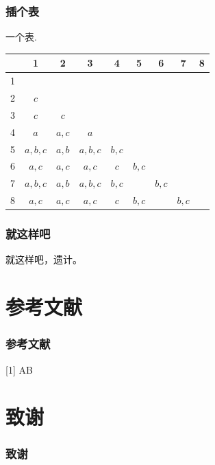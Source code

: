 \documentclass[notheorems,mathserif,table,Singapore]{beamer}
\begin{document}
\begin{frame}\frametitle{插个表}
一个表.
 \begin{table}
  \centering \addtolength{\tabcolsep}{1mm}
 \begin{tabular}{ccccccccc}
   \hline
        & 1 & 2 & 3 & 4 & 5 & 6 & 7 & 8 \\
   \hline
   1 &         &       &          &       &       &       &       &  \\
   2 & $c$     &       &          &       &       &       &       &  \\
   3 & $c$     & $c $  &          &       &       &       &       &  \\
   4 & $a$     & $a,c$ & $a $     &       &       &       &       &  \\
   5 & $a,b,c$ & $a,b$ & $a,b,c$  & $b,c$ &       &       &       &  \\
   6 & $a,c$   & $a,c$ & $a,c$    & $c $  & $b,c$ &       &       &  \\
   7 & $a,b,c$ & $a,b$ & $a,b,c$  & $b,c$ &       & $b,c$ &       &  \\
   8 & $a,c$   & $a,c$ & $a,c$    & $c$   & $b,c$ &       & $b,c$ &  \\
   \hline
 \end{tabular}\label{dismatrix}
 \end{table}
\end{frame}
\begin{frame}\frametitle{就这样吧}
就这样吧，遗计。
\end{frame}
\section{参考文献}
\begin{frame}\frametitle{参考文献}
[1] A\newline
[2] B
\end{frame}
\section{致谢}

\begin{frame}\frametitle{致谢}
\end{frame}
\end{document}
